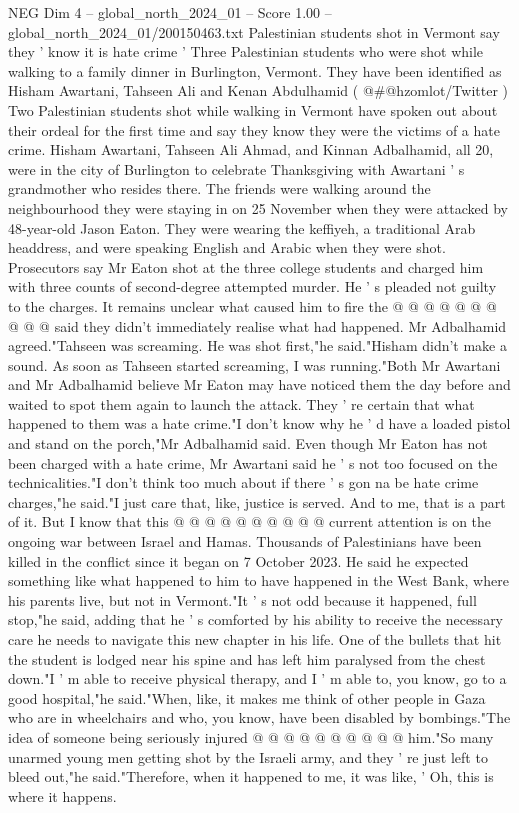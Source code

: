 \begin{textsample}{NEG Dim 4 – global\_north\_2024\_01 – Score 1.00 – global\_north\_2024\_01/200150463.txt}  \label{ex:f4_neg_118}
Palestinian students shot in Vermont say they ' know it is hate crime ' Three Palestinian students who were shot while walking to a family dinner in Burlington, Vermont.
They have been identified as Hisham Awartani, Tahseen Ali and Kenan Abdulhamid ( @\#@hzomlot/Twitter ) Two Palestinian students shot while walking in Vermont have spoken out about their ordeal for the first time and say they know they were the victims of a hate crime.
Hisham Awartani, Tahseen Ali Ahmad, and Kinnan Adbalhamid, all 20, were in the city of Burlington to celebrate Thanksgiving with Awartani ' s grandmother who resides there.
The friends were walking around the neighbourhood they were staying in on 25 November when they were attacked by 48-year-old Jason Eaton.
They were wearing the keffiyeh, a traditional Arab headdress, and were speaking English and Arabic when they were shot.
Prosecutors say Mr Eaton shot at the three college students and charged him with three counts of second-degree attempted murder.
He ' s pleaded not guilty to the charges.
It remains unclear what caused him to fire the @ @ @ @ @ @ @ @ @ @ said they didn't immediately realise what had happened.
Mr Adbalhamid agreed."Tahseen was screaming.
He was shot first,"he said."Hisham didn't make a sound.
As soon as Tahseen started screaming, I was running."Both Mr Awartani and Mr Adbalhamid believe Mr Eaton may have noticed them the day before and waited to spot them again to launch the attack.
They ' re certain that what happened to them was a hate crime."I don't know why he ' d have a loaded pistol and stand on the porch,"Mr Adbalhamid said.
Even though Mr Eaton has not been charged with a hate crime, Mr Awartani said he ' s not too focused on the technicalities."I don't think too much about if there ' s gon na be hate crime charges,"he said."I just care that, like, justice is served.
And to me, that is a part of it.
But I know that this @ @ @ @ @ @ @ @ @ @ current attention is on the ongoing war between Israel and Hamas.
Thousands of Palestinians have been killed in the conflict since it began on 7 October 2023.
He said he expected something like what happened to him to have happened in the West Bank, where his parents live, but not in Vermont."It ' s not odd because it happened, full stop,"he said, adding that he ' s comforted by his ability to receive the necessary care he needs to navigate this new chapter in his life.
One of the bullets that hit the student is lodged near his spine and has left him paralysed from the chest down."I ' m able to receive physical therapy, and I ' m able to, you know, go to a good hospital,"he said."When, like, it makes me think of other people in Gaza who are in wheelchairs and who, you know, have been disabled by bombings."The idea of someone being seriously injured @ @ @ @ @ @ @ @ @ @ him."So many unarmed young men getting shot by the Israeli army, and they ' re just left to bleed out,"he said."Therefore, when it happened to me, it was like, ' Oh, this is where it happens.

\end{textsample}
